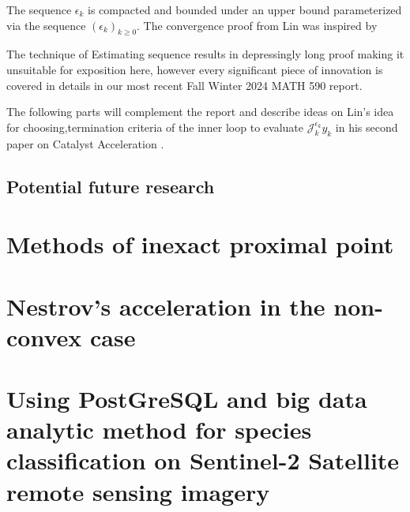 \documentclass[12pt]{article}
\begin{document}
    The sequence $\epsilon_k$ is compacted and bounded under an upper bound parameterized via the sequence $(\epsilon_k)_{k \ge 0}$. 
    The convergence proof from Lin was inspired by 
    \par
    The technique of Estimating sequence results in depressingly long proof making it unsuitable for exposition here, however every significant piece of innovation is covered in details in our most recent Fall Winter 2024 MATH 590 report. 
    \par 
    The following parts will complement the report and describe ideas on Lin's idea for choosing,termination criteria of the inner loop to evaluate $\mathcal J_k^{\epsilon_k} y_k$ in his second paper on Catalyst Acceleration \cite{lin_catalyst_2018}. 
    


        
    \subsection{Potential future research}

    

\section{Methods of inexact proximal point}\label{sec:inexact-prox}
    

\section{Nestrov's acceleration in the non-convex case}\label{sec:nes-acc-ncnvx}
    


\section{Using PostGreSQL and big data analytic method for species classification on Sentinel-2 Satellite remote sensing imagery}




\newpage

\appendix
\end{document}
